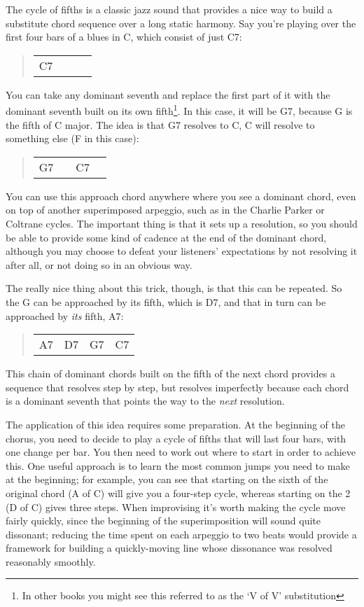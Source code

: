 \documentclass[english]{./gbook}
\begin{document}
\begin{large}
The cycle of fifths is a classic jazz sound that provides a nice way to build a substitute chord sequence over a long static harmony. Say you're playing over the first four bars of a blues in C, which consist of just C7:
\begin{quote}
\begin{tabular}{|p{3cm}|p{3cm}|p{3cm}|p{3cm}|}
	C7 & &  &
\end{tabular}
\end{quote}
You can take any dominant seventh and replace the first part of it with the dominant seventh built on its own fifth\footnote{In other books you might see this referred to as the `V of V' substitution}. In this case, it will be G7, because G is the fifth of C major. The idea is that G7 resolves to C, C will resolve to something else (F in this case):
\begin{quote}
\begin{tabular}{|p{3cm}|p{3cm}|p{3cm}|p{3cm}|}
	G7 & &C7  &
\end{tabular}
\end{quote}
You can use this approach chord anywhere where you see a dominant chord, even on top of another superimposed arpeggio, such as in the Charlie Parker or Coltrane cycles. The important thing is that it sets up a resolution, so you should be able to provide some kind of cadence at the end of the dominant chord, although you may choose to defeat your listeners' expectations by not resolving it after all, or not doing so in an obvious way.

The really nice thing about this trick, though, is that this can be repeated. So the G can be approached by its fifth, which is D7, and that in turn can be approached by \emph{its} fifth, A7:
\begin{quote}
\begin{tabular}{|p{3cm}|p{3cm}|p{3cm}|p{3cm}|}
	A7 &D7 &G7  &C7
\end{tabular}
\end{quote}
This chain of dominant chords built on the fifth of the next chord provides a sequence that resolves step by step, but resolves imperfectly because each chord is a dominant seventh that points the way to the \emph{next} resolution.

The application of this idea requires some preparation. At the beginning of the chorus, you need to decide to play a cycle of fifths that will last four bars, with one change per bar. You then need to work out where to start in order to achieve this. One useful approach is to learn the most common jumps you need to make at the beginning; for example, you can see that starting on the sixth of the original chord (A of C) will give you a four-step cycle, whereas starting on the 2 (D of C) gives three steps. When improvising it's worth making the cycle move fairly quickly, since the beginning of the superimposition will sound quite dissonant; reducing the time spent on each arpeggio to two beats would provide a framework for building a quickly-moving line whose dissonance was resolved reasonably smoothly.



\end{large}
\end{document}
